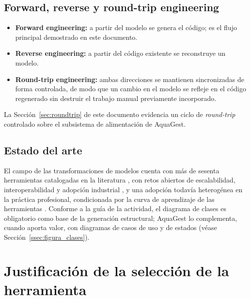 \documentclass[11pt,a4paper]{article}
\begin{document}
\subsection{Forward, reverse y round-trip engineering}
\begin{itemize}[nosep]
  \item \textbf{Forward engineering:} a partir del modelo se genera el código; es el flujo principal
        demostrado en este documento.
  \item \textbf{Reverse engineering:} a partir del código existente se reconstruye un modelo.
  \item \textbf{Round-trip engineering:} ambas direcciones se mantienen sincronizadas de forma
        controlada, de modo que un cambio en el modelo se refleje en el código regenerado sin
        destruir el trabajo manual previamente incorporado.
\end{itemize}
La Sección~\ref{sec:roundtrip} de este documento evidencia un ciclo de \textit{round-trip} controlado
sobre el subsistema de alimentación de AquaGest.

\subsection{Estado del arte}
El campo de las transformaciones de modelos cuenta con más de sesenta herramientas catalogadas en
la literatura \cite{kahani2019}, con retos abiertos de escalabilidad, interoperabilidad y adopción
industrial \cite{bucchiarone2020}, y una adopción todavía heterogénea en la práctica profesional,
condicionada por la curva de aprendizaje de las herramientas \cite{whittle2014}. Conforme a la guía de
la actividad, el diagrama de clases es obligatorio como base de la generación estructural; AquaGest lo
complementa, cuando aporta valor, con diagramas de casos de uso y de estados (véase
Sección~\ref{ssec:figura_clases}).

\section{Justificación de la selección de la herramienta}
\end{document}
